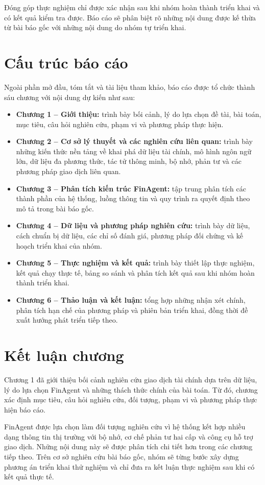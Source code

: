 Đóng góp thực nghiệm chỉ được xác nhận sau khi nhóm hoàn thành triển khai và có kết quả kiểm tra được. Báo cáo sẽ phân biệt rõ những nội dung được kế thừa từ bài báo gốc với những nội dung do nhóm tự triển khai.

\section{Cấu trúc báo cáo}

Ngoài phần mở đầu, tóm tắt và tài liệu tham khảo, báo cáo được tổ chức thành sáu chương với nội dung dự kiến như sau:

\begin{itemize}
    \item \textbf{Chương 1 -- Giới thiệu:} trình bày bối cảnh, lý do lựa chọn đề tài, bài toán, mục tiêu, câu hỏi nghiên cứu, phạm vi và phương pháp thực hiện.

    \item \textbf{Chương 2 -- Cơ sở lý thuyết và các nghiên cứu liên quan:} trình bày những kiến thức nền tảng về khai phá dữ liệu tài chính, mô hình ngôn ngữ lớn, dữ liệu đa phương thức, tác tử thông minh, bộ nhớ, phản tư và các phương pháp giao dịch liên quan.

    \item \textbf{Chương 3 -- Phân tích kiến trúc FinAgent:} tập trung phân tích các thành phần của hệ thống, luồng thông tin và quy trình ra quyết định theo mô tả trong bài báo gốc.

    \item \textbf{Chương 4 -- Dữ liệu và phương pháp nghiên cứu:} trình bày dữ liệu, cách chuẩn bị dữ liệu, các chỉ số đánh giá, phương pháp đối chứng và kế hoạch triển khai của nhóm.

    \item \textbf{Chương 5 -- Thực nghiệm và kết quả:} trình bày thiết lập thực nghiệm, kết quả chạy thực tế, bảng so sánh và phân tích kết quả sau khi nhóm hoàn thành triển khai.

    \item \textbf{Chương 6 -- Thảo luận và kết luận:} tổng hợp những nhận xét chính, phân tích hạn chế của phương pháp và phiên bản triển khai, đồng thời đề xuất hướng phát triển tiếp theo.
\end{itemize}

\section{Kết luận chương}

Chương 1 đã giới thiệu bối cảnh nghiên cứu giao dịch tài chính dựa trên dữ liệu, lý do lựa chọn FinAgent và những thách thức chính của bài toán. Từ đó, chương xác định mục tiêu, câu hỏi nghiên cứu, đối tượng, phạm vi và phương pháp thực hiện báo cáo.

FinAgent được lựa chọn làm đối tượng nghiên cứu vì hệ thống kết hợp nhiều dạng thông tin thị trường với bộ nhớ, cơ chế phản tư hai cấp và công cụ hỗ trợ giao dịch. Những nội dung này sẽ được phân tích chi tiết hơn trong các chương tiếp theo. Trên cơ sở nghiên cứu bài báo gốc, nhóm sẽ từng bước xây dựng phương án triển khai thử nghiệm và chỉ đưa ra kết luận thực nghiệm sau khi có kết quả thực tế.
